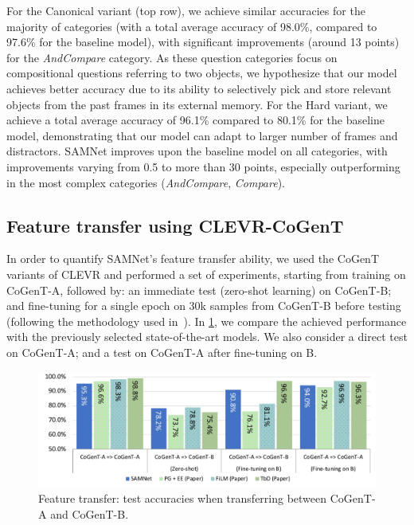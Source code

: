 For the Canonical variant (top row), we achieve similar accuracies for the majority of categories (with a total average accuracy of 98.0\%, compared to 97.6\% for the baseline model), with significant improvements (around 13 points) for the \textit{AndCompare} category.
As these question categories focus on compositional questions referring to two objects, we hypothesize that our model achieves better accuracy due to its ability to selectively pick and store relevant objects from the past frames in its external memory.
For the Hard variant, we achieve a total average accuracy of 96.1\% compared to 80.1\% for the baseline model, demonstrating that our model can adapt to larger number of frames and distractors.
SAMNet improves upon the baseline model on all categories, with improvements varying from 0.5 to more than 30 points, especially outperforming in the most complex categories (\textit{AndCompare}\uX, \textit{Compare}\uX).


\subsection{Feature transfer using CLEVR-CoGenT}
\label{sec:feature}

In order to quantify SAMNet's feature transfer ability, we used the CoGenT variants of CLEVR and performed a set of experiments, starting from training on CoGenT-A, followed by:
an immediate test (zero-shot learning) on CoGenT-B; and fine-tuning for a single epoch on 30k samples from CoGenT-B before testing (following the methodology used in~\cite{johnson2017inferring,mascharka2018transparency,perez2018film,marois2018transfer}).
In \cref{fig:CoGenT-B-results}, we compare the achieved performance with the previously selected state-of-the-art models.
We also consider a direct test on CoGenT-A; and a test on CoGenT-A after fine-tuning on B.

\begin{figure}[htbp]
	\centering
	\includegraphics[width=\textwidth]{../img/plots/cogent_feature_transfer_baselines.pdf}
	\caption{Feature transfer: test accuracies when transferring between CoGenT-A and CoGenT-B.}
	\label{fig:CoGenT-B-results}
\end{figure}

